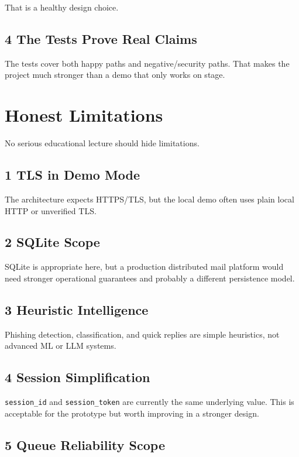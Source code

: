 \documentclass[11pt,a4paper]{article}
\begin{document}
That is a healthy design choice.

\subsection{4 The Tests Prove Real Claims}

The tests cover both happy paths and negative/security paths. That makes the project much stronger than a demo that only works on stage.


\section{Honest Limitations}

No serious educational lecture should hide limitations.

\subsection{1 TLS in Demo Mode}

The architecture expects HTTPS/TLS, but the local demo often uses plain local HTTP or unverified TLS.

\subsection{2 SQLite Scope}

SQLite is appropriate here, but a production distributed mail platform would need stronger operational guarantees and probably a different persistence model.

\subsection{3 Heuristic Intelligence}

Phishing detection, classification, and quick replies are simple heuristics, not advanced ML or LLM systems.

\subsection{4 Session Simplification}

\nolinkurl{session_id} and \nolinkurl{session_token} are currently the same underlying value. This is acceptable for the prototype but worth improving in a stronger design.

\subsection{5 Queue Reliability Scope}
\end{document}
